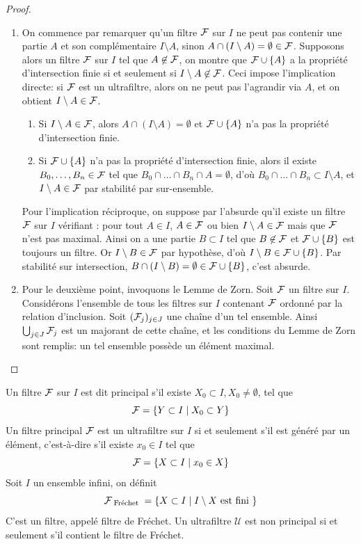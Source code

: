 \begin{proof}
\begin{enumerate}
\item On commence par remarquer qu'un filtre $\mathcal{F}$ sur $I$ ne peut pas contenir une partie $A$ et son complémentaire $I \setminus A$,
sinon $A \cap (I \setminus A) = \emptyset \in \mathcal{F}$. Supposons alors un filtre $\mathcal{F}$ sur $I$ tel que $A \not\in \mathcal{F}$, on montre que
$\mathcal{F} \cup \{A\}$ a la propriété d'intersection finie si et seulement si $I \setminus A \not\in \mathcal{F}$. Ceci impose l'implication directe: si $\mathcal{F}$ est
un ultrafiltre, alors on ne peut pas l'agrandir via $A$, et on obtient $I \setminus A \in \mathcal{F}$.
\begin{enumerate}[label= (\roman*)]
\item Si $I \setminus A \in \mathcal{F}$, alors $A \cap (I \setminus A) = \emptyset$ et $\mathcal{F} \cup \{A\}$ n'a pas la propriété d'intersection finie.
\item Si $\mathcal{F} \cup \{A\}$ n'a pas la propriété d'intersection finie,
alors il existe $B_0,\dots,B_n \in \mathcal{F}$ tel que $B_0 \cap \dots \cap B_n \cap A = \emptyset$, d'où $B_0 \cap \dots \cap B_n \subset I \setminus A$,
et $I \setminus A \in \mathcal{F}$ par stabilité par sur-ensemble.
\end{enumerate}
Pour l'implication réciproque, on suppose par l'absurde qu'il existe un filtre $\mathcal{F}$ sur $I$ vérifiant : pour tout $A \in I$, $A \in \mathcal{F}$ ou bien
$I \setminus A \in \mathcal{F}$ mais que $\mathcal{F}$ n'est pas maximal. Ainsi on a une partie $B \subset I$ tel que $B \not\in \mathcal{F}$ et $\mathcal{F} \cup \{B\}$ est toujours un filtre.
Or $I \setminus B \in \mathcal{F}$ par hypothèse, d'où $I \setminus B \in \mathcal{F} \cup \{B\}$. Par stabilité sur intersection, $B \cap (I \setminus B) = \emptyset \in \mathcal{F} \cup \{B\}$, 
c'est absurde.
\item Pour le deuxième point, invoquons le Lemme de Zorn. Soit $\mathcal{F}$ un filtre sur $I$. Considérons l'ensemble de tous les filtres sur $I$ contenant $\mathcal{F}$ ordonné par 
la relation d'inclusion. Soit $(\mathcal{F}_j)_{j \in J}$ une chaîne d'un tel ensemble. Ainsi $\bigcup_{j \in J} \mathcal{F}_j$ est un majorant de cette chaîne, et les conditions du
Lemme de Zorn sont remplis: un tel ensemble possède un élément maximal.
\end{enumerate}
\end{proof}

\begin{exem}
Un filtre $\mathcal{F}$ sur $I$ est dit principal s'il existe $X_0 \subset I, X_0 \ne \emptyset$, tel que 
\[ \mathcal{F} = \{ Y \subset I \mid X_0 \subset Y \} \]
Un filtre principal $\mathcal{F}$ est un ultrafiltre sur $I$ si et seulement s'il est généré par un élément, c'est-à-dire s'il existe $x_0 \in I$
tel que
\[ \mathcal{F} = \{ X \subset I \mid x_0 \in X \} \]
Soit $I$ un ensemble infini, on définit
\[ \mathcal{F}_{\text{ Fréchet }} = \{ X \subset I \mid I \setminus X \text{ est fini } \} \] C'est un filtre,
appelé filtre de Fréchet. Un ultrafiltre $\mathcal{U}$ est non principal si et seulement s'il contient le filtre de Fréchet.
\end{exem}

